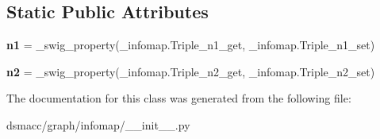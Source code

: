 \subsection*{Static Public Attributes}
\begin{DoxyCompactItemize}
\item 
\mbox{\label{classdsmacc_1_1graph_1_1infomap_1_1Triple_ac43537d0087501d83812764d82f1ad54}} 
{\bfseries n1} = \+\_\+swig\+\_\+property(\+\_\+infomap.\+Triple\+\_\+n1\+\_\+get, \+\_\+infomap.\+Triple\+\_\+n1\+\_\+set)
\item 
\mbox{\label{classdsmacc_1_1graph_1_1infomap_1_1Triple_a5ffa4299774d34192349fc8185df61eb}} 
{\bfseries n2} = \+\_\+swig\+\_\+property(\+\_\+infomap.\+Triple\+\_\+n2\+\_\+get, \+\_\+infomap.\+Triple\+\_\+n2\+\_\+set)
\end{DoxyCompactItemize}


The documentation for this class was generated from the following file\+:\begin{DoxyCompactItemize}
\item 
dsmacc/graph/infomap/\+\_\+\+\_\+init\+\_\+\+\_\+.\+py\end{DoxyCompactItemize}
